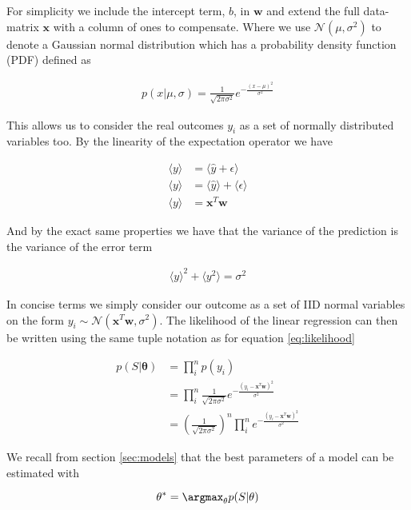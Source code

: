 \noindent For simplicity we include the intercept term, $b$,  in $\mathbf{w}$ and extend the full data-matrix $\mathbf{x}$ with a column of ones to compensate. Where we use $\mathcal{N}(\mu, \sigma^2)$ to denote a Gaussian normal distribution which has a probability density function (PDF) defined as 

\begin{align}
p(x | \mu, \sigma) = \frac{1}{\sqrt{2\pi \sigma^2}}e^{-\frac{(x - \mu)^2}{\sigma^2}}
\end{align}

\noindent This allows us to consider the real outcomes $y_i$ as a set of normally distributed variables too. By the linearity of the expectation operator we have 

\begin{align}
\langle y \rangle &= \langle \hat{y} + \epsilon \rangle  \\
\langle y \rangle &= \langle \hat{y} \rangle + \langle \epsilon \rangle \\
\langle y \rangle &= \mathbf{x}^T\mathbf{w}
\end{align}

\noindent And by the exact same properties we have that the variance of the prediction is the variance of the error term 

\begin{align}
\langle y\rangle^2 + \langle y^2\rangle = \sigma^2
\end{align}

\noindent In concise terms we simply consider our outcome as a set of IID normal variables on the form $y_i \sim \mathcal{N}(\mathbf{x}^T\mathbf{w}, \sigma^2)$. The likelihood of the linear regression can then be written using the same tuple notation as for equation \ref{eq:likelihood}

\begin{align}
p(S|\mathbf{\theta}) &= \prod_i^n p(y_i) \\
&= \prod_i^n \frac{1}{\sqrt{2\pi \sigma^2}}e^{-\frac{(y_i - \mathbf{x}^T\mathbf{w})^2}{\sigma^2}} \\
&= \left(\frac{1}{\sqrt{2\pi \sigma^2}} \right)^n \prod_i^n e^{-\frac{(y_i - \mathbf{x}^T\mathbf{w})^2}{\sigma^2}}
\end{align}

\noindent We recall from section \ref{sec:models} that the best parameters of a model can be estimated with 

\begin{equation}
\mathbf{\theta}^* = \argmax_\mathbf{\theta} p(S|\mathbf{\theta})
\end{equation}

